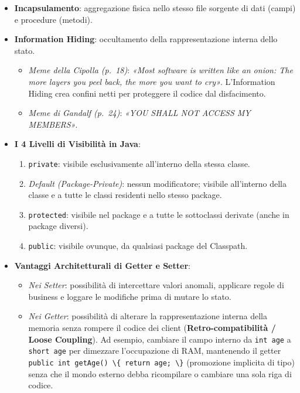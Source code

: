 \documentclass[11pt,a4paper]{article}
\newcommand{\passthrough}[1]{#1}
\providecommand{\tightlist}{\setlength{\itemsep}{0pt}\setlength{\parskip}{0pt}}
\begin{document}
\begin{itemize}
\tightlist
\item
  \textbf{Incapsulamento}: aggregazione fisica nello stesso file
  sorgente di dati (campi) e procedure (metodi).
\item
  \textbf{Information Hiding}: occultamento della rappresentazione
  interna dello stato.

  \begin{itemize}
  \tightlist
  \item
    \emph{Meme della Cipolla (p.~18)}: \emph{«Most software is written
    like an onion: The more layers you peel back, the more you want to
    cry»}. L'Information Hiding crea confini netti per proteggere il
    codice dal disfacimento.
  \item
    \emph{Meme di Gandalf (p.~24)}: \emph{«YOU SHALL NOT ACCESS MY
    MEMBERS»}.
  \end{itemize}
\item
  \textbf{I 4 Livelli di Visibilità in Java}:

  \begin{enumerate}
  \def\labelenumi{\arabic{enumi}.}
  \tightlist
  \item
    \passthrough{\lstinline!private!}: visibile esclusivamente
    all'interno della stessa classe.
  \item
    \emph{Default (Package-Private)}: nessun modificatore; visibile
    all'interno della classe e a tutte le classi residenti nello stesso
    package.
  \item
    \passthrough{\lstinline!protected!}: visibile nel package e a tutte
    le sottoclassi derivate (anche in package diversi).
  \item
    \passthrough{\lstinline!public!}: visibile ovunque, da qualsiasi
    package del Classpath.
  \end{enumerate}
\item
  \textbf{Vantaggi Architetturali di Getter e Setter}:

  \begin{itemize}
  \tightlist
  \item
    \emph{Nei Setter}: possibilità di intercettare valori anomali,
    applicare regole di business e loggare le modifiche prima di mutare
    lo stato.
  \item
    \emph{Nei Getter}: possibilità di alterare la rappresentazione
    interna della memoria senza rompere il codice dei client
    (\textbf{Retro-compatibilità / Loose Coupling}). Ad esempio,
    cambiare il campo interno da \passthrough{\lstinline!int age!} a
    \passthrough{\lstinline!short age!} per dimezzare l'occupazione di
    RAM, mantenendo il getter
    \passthrough{\lstinline!public int getAge() \{ return age; \}!}
    (promozione implicita di tipo) senza che il mondo esterno debba
    ricompilare o cambiare una sola riga di codice.
  \end{itemize}
\end{itemize}
\end{document}
